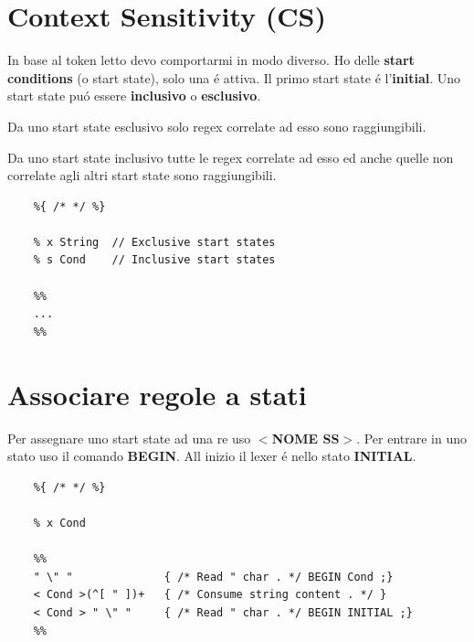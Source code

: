 \section{Context Sensitivity (CS)}
In base al token letto devo comportarmi in modo diverso.
Ho delle \textbf{start conditions} (o start state), solo una \'e attiva. Il primo start state \'e l'\textbf{initial}.
Uno start state pu\'o essere \textbf{inclusivo} o \textbf{esclusivo}.

Da uno start state esclusivo solo regex correlate ad esso sono raggiungibili.

Da uno start state inclusivo tutte le regex correlate ad esso ed anche quelle non correlate agli altri start state sono raggiungibili.

\begin{lstlisting}
	%{ /* */ %}

	% x String 	// Exclusive start states
	% s Cond 	// Inclusive start states

	%%
	...
	%%
\end{lstlisting}

\section{Associare regole a stati}
Per assegnare uno start state ad una re uso \textbf{$<$NOME SS$>$}.
Per entrare in uno stato uso il comando \textbf{BEGIN}.
All inizio il lexer \'e nello stato \textbf{INITIAL}.
\begin{lstlisting}
	%{ /* */ %}

	% x Cond
	
	%%
	" \" "				{ /* Read " char . */ BEGIN Cond ;}
	< Cond >(^[ " ])+	{ /* Consume string content . */ }
	< Cond > " \" "		{ /* Read " char . */ BEGIN INITIAL ;}
	%%
\end{lstlisting}

